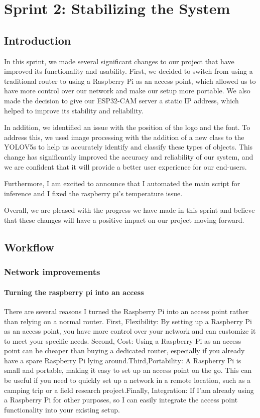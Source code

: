 %
%



\chapter{Sprint 2: Stabilizing the System}
\section{Introduction}
In this sprint, we made several significant changes to our project that have improved its functionality and usability. First, we decided to switch from using a traditional router to using a Raspberry Pi as an access point, which allowed us to have more control over our network and make our setup more portable. We also made the decision to give our ESP32-CAM server a static IP address, which helped to improve its stability and reliability.

In addition, we identified an issue with the position of the logo and the font. To address this, we used image processing with the addition of a new class to the YOLOV5s to help us accurately identify and classify these types of objects. This change has significantly improved the accuracy and reliability of our system, and we are confident that it will provide a better user experience for our end-users.

Furthermore, I am excited to announce that I automated the main script for inference and I fixed the raspberry pi's temperature issue.

Overall, we are pleased with the progress we have made in this sprint and believe that these changes will have a positive impact on our project moving forward.
\section{Workflow}
\subsection{Network improvements}
\subsubsection{Turning the raspberry pi into an access}
There are several reasons I turned the Raspberry Pi into an access point rather than relying on a normal router. First, Flexibility: By setting up a Raspberry Pi as an access point, you have more control over your network and can customize it to meet your specific needs. Second, Cost: Using a Raspberry Pi as an access point can be cheaper than buying a dedicated router, especially if you already have a spare Raspberry Pi lying around.Third,Portability: A Raspberry Pi is small and portable, making it easy to set up an access point on the go. This can be useful if you need to quickly set up a network in a remote location, such as a camping trip or a field research project.Finally, Integration: If I'am already using a Raspberry Pi for other purposes, so I can easily integrate the access point functionality into your existing setup.
